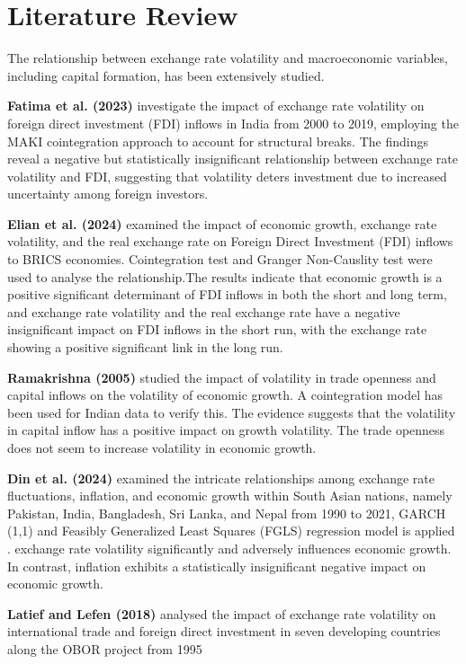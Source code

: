 \documentclass{article} %
\begin{document}
\section{Literature Review}
The relationship between exchange rate volatility and macroeconomic variables, including capital
formation, has been extensively studied.\par
\textbf{Fatima et al. (2023)} investigate the impact of exchange rate volatility on foreign direct
investment (FDI) inflows in India from 2000 to 2019, employing the MAKI cointegration
approach to account for structural breaks. The findings reveal a negative but statistically
insignificant relationship between exchange rate volatility and FDI, suggesting that volatility
deters investment due to increased uncertainty among foreign investors.\par
\textbf{Elian et al. (2024)} examined the impact of economic growth, exchange rate volatility, and the
real exchange rate on Foreign Direct Investment (FDI) inflows to BRICS economies.
Cointegration test and Granger Non-Causlity test were used to analyse the relationship.The
results indicate that economic growth is a positive significant determinant of FDI inflows in
both the short and long term, and exchange rate volatility and the real exchange rate have a
negative insignificant impact on FDI inflows in the short run, with the exchange rate showing a
positive significant link in the long run.\par
\textbf{Ramakrishna (2005)} studied the impact of volatility in trade openness and capital inflows on
the volatility of economic growth. A cointegration model has been used for Indian data to verify
this. The evidence suggests that the volatility in capital inflow has a positive impact on growth
volatility. The trade openness does not seem to increase volatility in economic growth.\par
\textbf{Din et al. (2024)} examined the intricate relationships among exchange rate fluctuations,
inflation, and economic growth within South Asian nations, namely Pakistan, India,
Bangladesh, Sri Lanka, and Nepal from 1990 to 2021, GARCH (1,1) and Feasibly Generalized
Least Squares (FGLS) regression model is applied . exchange rate volatility significantly and
adversely influences economic growth. In contrast, inflation exhibits a statistically insignificant
negative impact on economic growth.\par
\textbf{Latief and Lefen (2018)} analysed the impact of exchange rate volatility on international trade
and foreign direct investment in seven developing countries along the OBOR project from 1995
\end{document}
